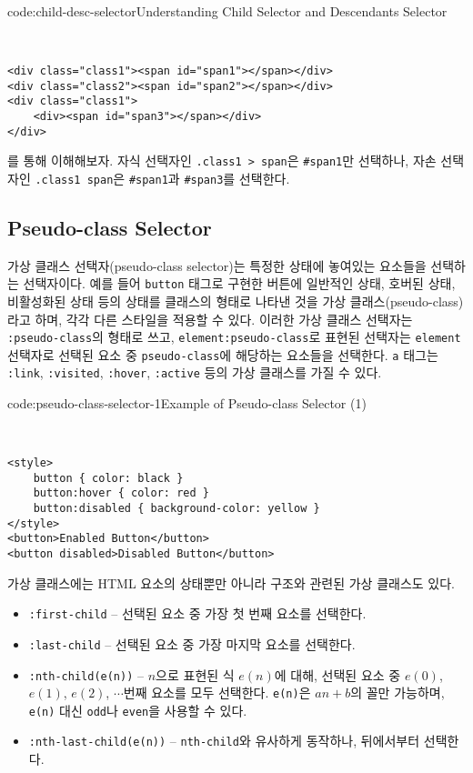 \begin{codeenv}{code:child-desc-selector}{Understanding Child Selector and Descendants Selector}\begin{verbatim}


<div class="class1"><span id="span1"></span></div>
<div class="class2"><span id="span2"></span></div>
<div class="class1">
    <div><span id="span3"></span></div>
</div>
\end{verbatim}
\end{codeenv}

를 통해 이해해보자. 자식 선택자인 \texttt{.class1 > span}은 \texttt{\#span1}만 선택하나, 자손 선택자인 \texttt{.class1 span}은 \texttt{\#span1}과 \texttt{\#span3}를 선택한다.

\subsection*{Pseudo-class Selector}
가상 클래스 선택자(pseudo-class selector)는 특정한 상태에 놓여있는 요소들을 선택하는 선택자이다. 예를 들어 \texttt{button} 태그로 구현한 버튼에 일반적인 상태, 호버된 상태, 비활성화된 상태 등의 상태를 클래스의 형태로 나타낸 것을 가상 클래스(pseudo-class)라고 하며, 각각 다른 스타일을 적용할 수 있다. 이러한 가상 클래스 선택자는 \texttt{:pseudo-class}의 형태로 쓰고, \texttt{element:pseudo-class}로 표현된 선택자는 \texttt{element} 선택자로 선택된 요소 중 \texttt{pseudo-class}에 해당하는 요소들을 선택한다. \texttt{a} 태그는 \texttt{:link}, \texttt{:visited}, \texttt{:hover}, \texttt{:active} 등의 가상 클래스를 가질 수 있다.

\begin{codeenv}{code:pseudo-class-selector-1}{Example of Pseudo-class Selector (1)}\begin{verbatim}


<style>
    button { color: black }
    button:hover { color: red }
    button:disabled { background-color: yellow }
</style>
<button>Enabled Button</button>
<button disabled>Disabled Button</button>
\end{verbatim}
\end{codeenv}

가상 클래스에는 HTML 요소의 상태뿐만 아니라 구조와 관련된 가상 클래스도 있다.

\begin{itemize}
    \item \texttt{:first-child} – 선택된 요소 중 가장 첫 번째 요소를 선택한다.
    \item \texttt{:last-child} – 선택된 요소 중 가장 마지막 요소를 선택한다.
    \item \texttt{:nth-child(e(n))} – $n$으로 표현된 식 $e(n)$에 대해, 선택된 요소 중 $e(0)$, $e(1)$, $e(2)$, $\cdots$번째 요소를 모두 선택한다. \texttt{e(n)}은 $an+b$의 꼴만 가능하며, \texttt{e(n)} 대신 \texttt{odd}나 \texttt{even}을 사용할 수 있다.
    \item \texttt{:nth-last-child(e(n))} – \texttt{nth-child}와 유사하게 동작하나, 뒤에서부터 선택한다.
\end{itemize}

